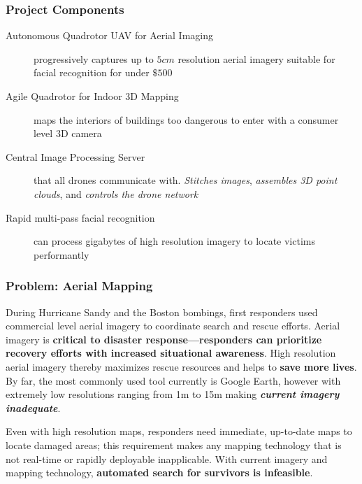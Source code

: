 \subsubsection{Project Components} %
\begin{description}
	\item[Autonomous Quadrotor UAV for Aerial Imaging] progressively captures up to $5 cm$ resolution aerial imagery suitable for facial recognition for under $\$500$
	\item[Agile Quadrotor for Indoor 3D Mapping] maps the interiors of buildings too dangerous to enter with a consumer level 3D camera
	\item[Central Image Processing Server] that all drones communicate with. \textit{Stitches images}, \textit{assembles 3D point clouds}, and \textit{controls the drone network}
	\item[Rapid multi-pass facial recognition] can process gigabytes of high resolution imagery to locate victims performantly
\end{description}


\subsubsection{Problem: Aerial Mapping}
\noindent
During Hurricane Sandy and the Boston bombings, first responders used commercial level aerial imagery to coordinate search and rescue efforts. \cite{Martinez:BostonBombingAerialImagery} Aerial imagery is \textbf{critical to disaster response---responders can prioritize recovery efforts with increased situational awareness}. High resolution aerial imagery thereby maximizes rescue resources and helps to \textbf{save more lives}. By far, the most commonly used tool currently is Google Earth, however with extremely low resolutions ranging from 1m to 15m making \textit{\textbf{current imagery inadequate}}. \cite{Google:GoogleEarthSpec}

\noindent
Even with high resolution maps, responders need immediate, up-to-date maps to locate damaged areas; this requirement makes any mapping technology that is not real-time or rapidly deployable inapplicable. %
With current imagery and mapping technology, \textbf{automated search for survivors is infeasible}.


